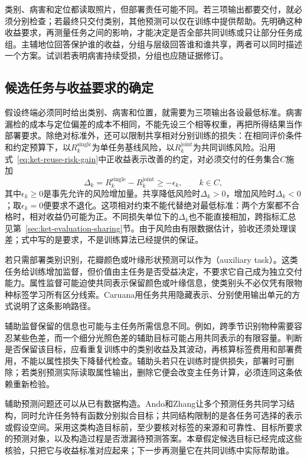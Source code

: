 类别、病害和定位都读取照片，但部署责任可能不同。若三项输出都要交付，就必须分别检查；若最终只交付类别，其他预测可以仅在训练中提供帮助。先明确这种收益要求，再测量任务之间的影响，才能决定是否全部共同训练或只让部分任务成组。主辅地位回答保护谁的收益，分组与层级回答谁和谁共享，两者可以同时描述一个方案。试训若表明病害持续受损，分组也应随证据修订。

\subsection{候选任务与收益要求的确定}
\label{sec:ket-sharing-candidates}

假设终端必须同时给出类别、病害和位置，就需要为三项输出各设最低标准。病害漏检的成本与定位偏差的成本不相同，不能先设三个相等权重，再把所得结果当作部署要求。除绝对标准外，还可以限制共享相对分别训练的损失：在相同评价条件和约定预算下，以$R_k^{\mathrm{single}}$为单任务基线风险，以$R_k^{\mathrm{joint}}$为共同训练风险。沿用式~\eqref{eq:ket-reuse-risk-gain}中正收益表示改善的约定，对必须交付的任务集合$C$施加
\begin{equation}
  \Delta_k=R_k^{\mathrm{single}}-R_k^{\mathrm{joint}}
  \geq-\epsilon_k,
  \qquad k\in C,
  \label{eq:ket-sharing-benefit-constraint}
\end{equation}
其中$\epsilon_k\geq0$是事先允许的风险增加量。共享降低风险时$\Delta_k>0$，增加风险时$\Delta_k<0$；取$\epsilon_k=0$便要求不退化。这项相对约束不能代替绝对最低标准：两个方案都不合格时，相对收益仍可能为正。不同损失单位下的$\Delta_k$也不能直接相加，跨指标汇总见第~\ref{sec:ket-evaluation-sharing}节。由于风险由有限数据估计，验收还须处理误差；式中写的是要求，不是训练算法已经提供的保证。

若只需部署类别识别，花瓣颜色或叶缘形状预测可以作为（auxiliary task）。这类任务给训练增加监督，但价值由主任务是否受益决定，不要求它自己成为独立交付能力。属性监督可能迫使共同表示保留颜色或叶缘信息，使类别头不必仅凭有限物种标签学习所有区分线索。Caruana用任务共用隐藏表示、分别使用输出单元的方式说明了这条影响路径。

辅助监督保留的信息也可能与主任务所需信息不同。例如，跨季节识别物种需要容忍某些色差，而一个细分光照色差的辅助目标可能占用共同表示的有限容量。判断是否保留该目标，应看重复训练中的类别收益及其波动，再核算标签费用和部署费用，不能以属性损失下降替代检查。辅助头若只在训练时提供损失，部署时可删除；若类别预测实际读取属性输出，删除它便会改变主任务计算，必须连同这条依赖重新检验。

辅助预测问题还可以从已有数据构造。Ando和Zhang让多个预测任务共同学习结构，同时允许任务特有函数分别拟合目标；共同结构限制的是各任务可选择的表示或假设空间。采用这类构造目标前，至少要核对标签的来源和可靠性、目标所要求的预测对象，以及构造过程是否泄漏待预测答案。本章假定候选目标已经完成这些核验，只把它与收益标准对应起来；下一步再测量它在共同训练中实际帮助谁。

